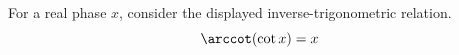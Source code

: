 \documentclass{article}
\begin{document}
For a real phase $x$, consider the displayed inverse-trigonometric relation.
\begin{equation}
  \arccot(\cot x)=x
\end{equation}
\end{document}
